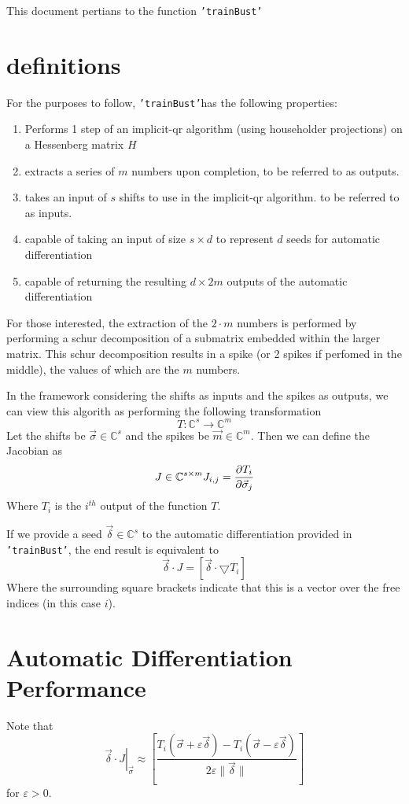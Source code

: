 \documentclass{article}
\newcommand{\tb}{\texttt{'trainBust'}}
\newcommand{\s}{\vec{\sigma}}
\renewcommand{\d}{\vec{\delta}}
\newcommand{\e}{\varepsilon}
\newcommand{\grad}{\bigtriangledown}
\begin{document}
This document pertians to the function \tb

\section{definitions}
For the purposes to follow, \tb has the following properties:
\begin{enumerate}
\item Performs 1 step of an implicit-qr algorithm 
  (using householder projections) on a Hessenberg matrix $H$
\item extracts a series of $m$ numbers upon completion, to be referred to as outputs.
\item takes an input of $s$ shifts to use in the implicit-qr algorithm. to be referred to as inputs.
\item capable of taking an input of size $s \times d$ to represent
  $d$ seeds for automatic differentiation
\item capable of returning the resulting $d \times 2m$ outputs of the automatic differentiation
\end{enumerate}

For those interested, the extraction of the $2 \cdot m$ numbers is performed by
performing a schur decomposition of a submatrix embedded within the larger matrix.
This schur decomposition results in a spike (or 2 spikes if perfomed in the middle),
the values of which are the $m$ numbers.

In the framework considering the shifts as inputs and the spikes as outputs,
we can view this algorith as performing the following transformation
\[
  T:\mathbb{C}^s \to \mathbb{C}^m
\]
Let the shifts be $\s \in \mathbb{C}^s$ and the spikes be $\vec{m} \in \mathbb{C}^m$.
Then we can define the Jacobian as 
\[
  J \in \mathbb{C}^{s \times m} \\
  J_{i,j} = \dfrac{\partial T_i }{\partial \s_j}
\]
Where $T_i$ is the $i^{th}$ output of the function $T$.

If we provide a seed $\d \in \mathbb{C}^s$ to the automatic differentiation provided
in \tb, the end result is equivalent to
\[
  \d \cdot J = [\d \cdot \grad T_i] 
\]
Where the surrounding square brackets indicate that this is a vector
over the free indices (in this case $i$).

\section{Automatic Differentiation Performance}
Note that
\[
  \left.\d \cdot J\right|_{\s} \approx \left[\dfrac{T_i(\s + \e\d) - T_i(\s - \e\d)}{2 \e \| \d \|}\right]
\]
for $\e > 0$.
\end{document}
